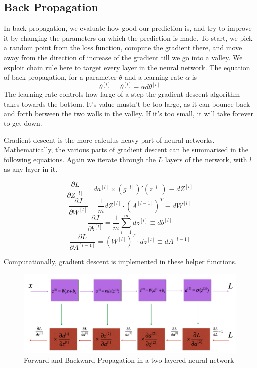 \documentclass{article}
\begin{document}
\subsection{Back Propagation}

In back propagation, we evaluate how good our prediction is, and try to improve it by changing the parameters on which the prediction is made. To start, we pick a random point from the loss function, compute the gradient there, and move away from the direction of increase of the gradient till we go into a valley. We exploit chain rule here to target every layer in the neural network. The equation of back propagation, for a parameter $\theta$ and a learning rate $\alpha$ is
$$ \theta^{[l]} = \theta^{[l]} - \alpha d \theta^{[l]}$$
The learning rate controls how large of a step the gradient descent algorithm takes towards the bottom. It's value mustn't be too large, as it can bounce back and forth between the two walls in the valley. If it's too small, it will take forever to get down.

Gradient descent is the more calculus heavy part of neural networks. Mathematically, the various parts of gradient descent can be summarised in the following equations. Again we iterate through the $L$ layers of the network, with $l$ as any layer in it.

$$\frac{\partial L}{\partial Z^{[l]}} = da^{[l]} \times (g^{[l]})'(z^{[l]}) \equiv dZ^{[l]}$$
$$\frac{\partial J}{\partial W^{[l]}} = \frac{1}{m} dZ^{[l]} \cdot (A^{[l-1]})^T \equiv dW^{[l]}$$
$$\frac{\partial J}{\partial b^{[l]}} = \frac{1}{m} \sum_{i=1}^{m} dz^{[l]} \equiv db^{[l]}$$
$$\frac{\partial L}{\partial A^{[l-1]}} = (W^{[l]})^T \cdot dz^{[l]} \equiv dA^{[l-1]}$$

Computationally, gradient descent is implemented in these helper functions.

\begin{figure}[H]
\includegraphics[width=15cm]{Images/twolayernn.png}
\centering
\caption{Forward and Backward Propagation in a two layered neural network}
\end{figure}
\end{document}
